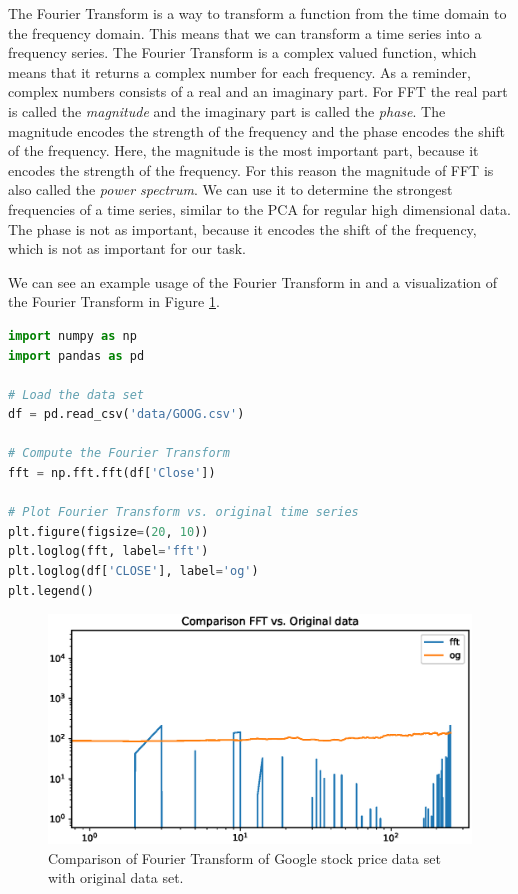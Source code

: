 The Fourier Transform is a way to transform a function from the time domain to the frequency domain.
This means that we can transform a time series into a frequency series.
The Fourier Transform is a complex valued function, which means that it returns a complex number for each frequency.
As a reminder, complex numbers consists of a real and an imaginary part.
For FFT the real part is called the \textit{magnitude} and the imaginary part is called the \textit{phase}.
The magnitude encodes the strength of the frequency and the phase encodes the shift of the frequency.
Here, the magnitude is the most important part, because it encodes the strength of the frequency.
For this reason the magnitude of FFT is also called the \textit{power spectrum}.
We can use it to determine the strongest frequencies of a time series, similar to the PCA for regular high dimensional data.
The phase is not as important, because it encodes the shift of the frequency, which is not as important for our task.

We can see an example usage of the Fourier Transform in  and a visualization of the Fourier Transform in Figure \ref{fig:fourier-transform}.
\begin{lstlisting}[language=Python, caption={Fourier Transform example}, label={code:fourier-transform}]
import numpy as np
import pandas as pd

# Load the data set
df = pd.read_csv('data/GOOG.csv')

# Compute the Fourier Transform
fft = np.fft.fft(df['Close'])

# Plot Fourier Transform vs. original time series
plt.figure(figsize=(20, 10))
plt.loglog(fft, label='fft')
plt.loglog(df['CLOSE'], label='og')
plt.legend()
\end{lstlisting}
\begin{figure}[h]
  \centering
  \includegraphics[width=.95\textwidth]{images/fft.eps}
  \caption{Comparison of Fourier Transform of Google stock price data set with original data set.}
  \label{fig:fourier-transform}
\end{figure}
